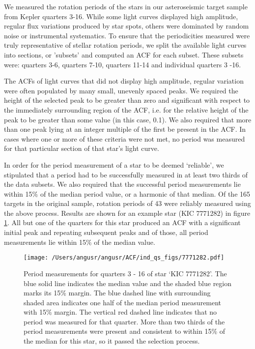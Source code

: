 \documentclass[12pt,preprint]{aastex}
\begin{document}
We measured the rotation periods of the stars in our
asteroseismic target sample from Kepler quarters 3-16. 
While some
light curves displayed high amplitude, regular flux variations
produced by star spots, others were dominated by random noise or instrumental
systematics. 
To ensure that the periodicities measured were truly
representative of stellar rotation periods, we split the available
light curves into sections, or 'subsets' and computed an ACF for
each subset. 
These subsets were: quarters 3-6, quarters 7-10, quarters
11-14 and individual quarters 3 -16.  

The ACFs of light curves that did not display high amplitude, regular
variation were often populated by many small, unevenly spaced peaks. We
required the height of the selected peak to be greater than zero and significant with respect to the
immediately surrounding region of the ACF, i.e. for the relative
height of the peak to be greater than some value (in this case,
0.1). We also required that more than one peak lying at an integer multiple of the first be present in the ACF. 
In cases where one or more of these criteria were not met, no
period was measured for that particular section of that star's light curve. 

In order for the period measurement of a star to be deemed `reliable',
we stipulated that a period had to be successfully measured in at
least two thirds of the
data subsets. 
We also required that the successful period
measurements lie within 15\% of the median period value, or a harmonic of that
median. 
Of the 165 targets in the original sample, rotation periods of 43 were reliably measured using the above process. 
Results are shown for an example star (KIC 7771282) in figure \ref{fig:ind_qs}. 
All but one of the quarters for this star produced an ACF with a significant initial peak and repeating subsequent peaks and of those, all period measurements lie within 15\% of the median value.  

\begin{figure}[ht]
\begin{center}
\texttt{[image: /Users/angusr/angusr/ACF/ind\_qs\_figs/7771282.pdf]}
\caption{Period measurements for quarters 3 - 16 of star `KIC 7771282'. The blue solid line indicates the median value and the shaded blue region marks its 15\% margin. The blue dashed line with surrounding shaded area indicates one half of the median period measurement with 15\% margin. The vertical red dashed line indicates that no period was measured for that quarter. More than two thirds of the period measurements were present and consistent to within 15\% of the median for this star, so it passed the selection process.}
\label{fig:ind_qs}
\end{center}
\end{figure}
\end{document}
